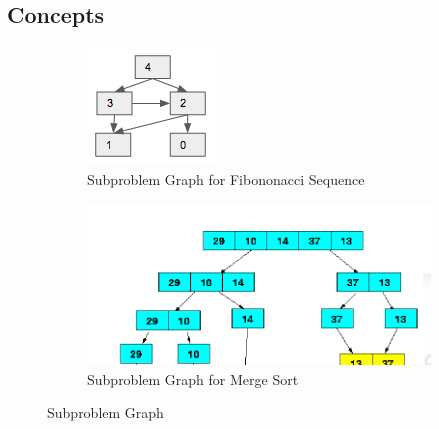 \documentclass[../main.tex]{subfiles}
\begin{document}
\subsection{Concepts}

\begin{figure}[ht!]
    \centering
    \begin{subfigure}[b]{0.3\textwidth}
    \includegraphics[width=\columnwidth]{fig/Subproblem_graph.png}
    \caption{Subproblem Graph for Fibononacci Sequence}
    \label{fig:subproblem_graph_1_fs}
    \end{subfigure}
    \begin{subfigure}[b]{0.65\textwidth}
    \includegraphics[width=\columnwidth]{fig/subproblem_graph_merge_sort.png}
    \caption{Subproblem Graph for Merge Sort}
    \label{fig:subproblem_graph_1_ms}
    \end{subfigure}
\caption{Subproblem Graph}
\label{fig:subproblem_graph_1}
\end{figure}
\end{document}
